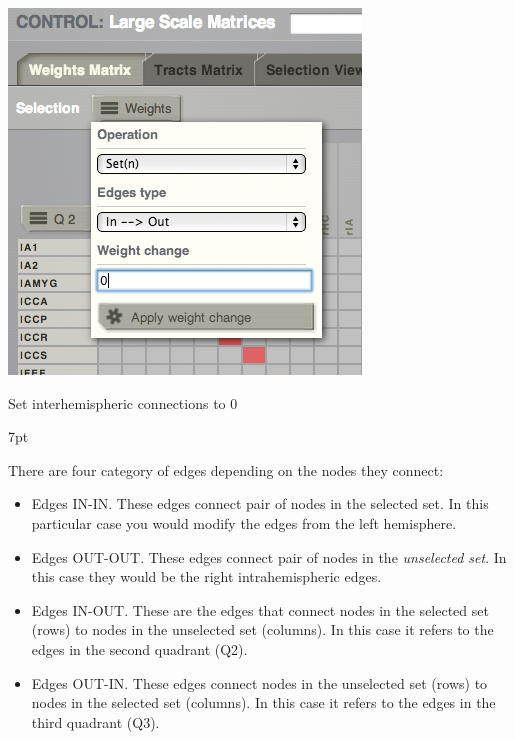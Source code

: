 \documentclass{tufte-handout}
\newenvironment{blah}{%
  \def\FrameCommand{%
    \hspace{1pt}%
    {\color{DarkOrange}\vrule width 2pt}%
    {\color{PeachPuff}\vrule width 4pt}%
    \colorbox{PeachPuff}%
  }%
  \MakeFramed{\advance\hsize-\width\FrameRestore}%
  \noindent\hspace{-4.55pt}%
  \begin{adjustwidth}{}{7pt}%
  \vspace{2pt}\vspace{2pt}%
}
{%
  \vspace{2pt}\end{adjustwidth}\endMakeFramed%
}
\begin{document}
\begin{marginfigure}
  \includegraphics[width=\linewidth]{Handout_UI_ModellingStructuralLesions_EdgeOperations}%
  \caption{Set interhemispheric connections to 0}%
  \label{fig:steps_05_06}%
\end{marginfigure}


\begin{blah}
There are four category of edges depending on the nodes they connect:
\begin{itemize}
  \item Edges IN-IN. These edges connect pair of nodes in the selected set. In this
  particular case you would modify the edges from the left hemisphere.
  \item Edges OUT-OUT. These edges connect pair of nodes in the \textit{unselected
  set}. In this case they would be the right intrahemispheric edges.
  \item Edges IN-OUT. These are the edges that connect nodes in the selected set
  (rows) to nodes in the unselected set (columns). In this case it refers to
  the edges in the second quadrant (Q2).
  \item Edges OUT-IN. These edges connect nodes in the unselected set (rows) to
  nodes in the selected set (columns). In this case it refers to the edges in the third
  quadrant (Q3).
\end{itemize}
\end{blah}
\end{document}
